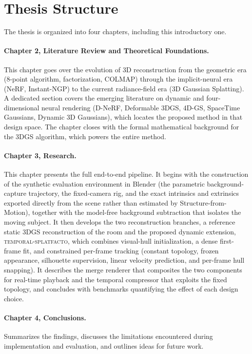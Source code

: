 \section{Thesis Structure}

\noindent
The thesis is organized into four chapters, including this introductory one.

\paragraph{Chapter 2, Literature Review and Theoretical Foundations.} This
chapter goes over the evolution of 3D reconstruction from the geometric era
(8-point algorithm, factorization, COLMAP) through the implicit-neural era
(NeRF, Instant-NGP) to the current radiance-field era (3D Gaussian Splatting). A
dedicated section covers the emerging literature on dynamic and four-dimensional
neural rendering (D-NeRF, Deformable 3DGS, 4D-GS, SpaceTime Gaussians, Dynamic
3D Gaussians), which locates the proposed method in that design space. The
chapter closes with the formal mathematical background for the 3DGS algorithm,
which powers the entire method.

\paragraph{Chapter 3, Research.} This chapter presents the full end-to-end
pipeline. It begins with the construction of the synthetic evaluation
environment in Blender (the parametric background-capture trajectory, the
fixed-camera rig, and the exact intrinsics and extrinsics exported directly from
the scene rather than estimated by Structure-from-Motion), together with the
model-free background subtraction that isolates the moving subject. It then
develops the two reconstruction branches, a reference static 3DGS reconstruction
of the room and the proposed dynamic extension, \textsc{temporal-splatfacto},
which combines visual-hull initialization, a dense first-frame fit, and
constrained per-frame tracking (constant topology, frozen appearance, silhouette
supervision, linear velocity prediction, and per-frame hull snapping). It
describes the merge renderer that composites the two components for real-time
playback and the temporal compressor that exploits the fixed topology, and
concludes with benchmarks quantifying the effect of each design choice.

\paragraph{Chapter 4, Conclusions.} Summarizes the findings, discusses the
limitations encountered during implementation and evaluation, and outlines ideas
for future work.
